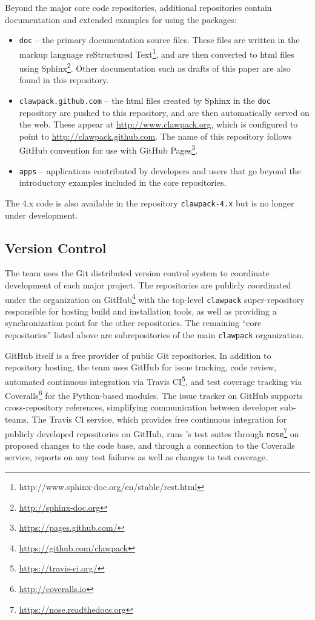 Beyond the major core code repositories, additional repositories contain
documentation and extended examples for using the packages:
\begin{itemize}
    \item \texttt{doc} -- the primary documentation source files.
    These files are written in the markup language reStructured
    Text\footnote{http://www.sphinx-doc.org/en/stable/rest.html}, and 
    are then converted to html files using
    Sphinx\footnote{\url{http://sphinx-doc.org}}.  Other documentation
    such as drafts of this paper are also found in this repository.
    \item \texttt{clawpack.github.com} -- the html files created by
    Sphinx in the \texttt{doc} repository are
    pushed to this repository, and are then automatically served on the web.
    These appear at \url{http://www.clawpack.org}, which
    is configured to point to \url{http://clawpack.github.com}.
    The name of this repository follows GitHub convention for use with
    GitHub Pages\footnote{\url{https://pages.github.com/}}.
    \item \texttt{apps} -- applications contributed by developers and
    users that go beyond the introductory examples included in the core
    repositories.
\end{itemize}
The \clawpack 4.x code is also available in the repository \texttt{clawpack-4.x}
but is no longer under development.


\subsection{Version Control}

The \clawpack team uses the Git distributed version control system
to coordinate development of each major project.  The repositories are
publicly coordinated under the \clawpack organization on
GitHub\footnote{\url{https://github.com/clawpack}} with the
top-level \texttt{clawpack} super-repository responsible for hosting
build and installation tools, as well as providing a synchronization
point for the other repositories.  The remaining ``core \clawpack repositories''
listed above are subrepositories of the main \texttt{clawpack} organization.

GitHub itself is a free provider of public Git repositories.  In addition to
repository hosting, the \clawpack team uses GitHub for issue tracking,
code review, automated continuous integration via Travis CI\footnote{\url{https://travis-ci.org/}},
and test coverage tracking via Coveralls\footnote{\url{http://coveralls.io}}
for the Python-based modules.  The issue tracker on
GitHub supports cross-repository references,
simplifying communication between \clawpack developer sub-teams.  The
Travis CI service, which provides free continuous integration for
publicly developed repositories on GitHub, runs \clawpack's test
suites through \texttt{nose}\footnote{\url{https://nose.readthedocs.org}}
on proposed changes
to the code base, and through a connection to the Coveralls service,
reports on any test failures as well as changes to test coverage.

